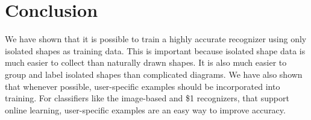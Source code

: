 \documentclass{egpubl}
\begin{document}
\section{Conclusion}

We have shown that it is possible to train a highly accurate recognizer using only isolated shapes as training data. This is important because isolated shape data is much easier to collect than naturally drawn shapes. It is also much easier to group and label isolated shapes than complicated diagrams.  We have also shown that whenever possible, user-specific examples should be incorporated into training. For classifiers like the image-based and \$1 recognizers, that support online learning, user-specific examples are an easy way to improve accuracy.





\end{document}
